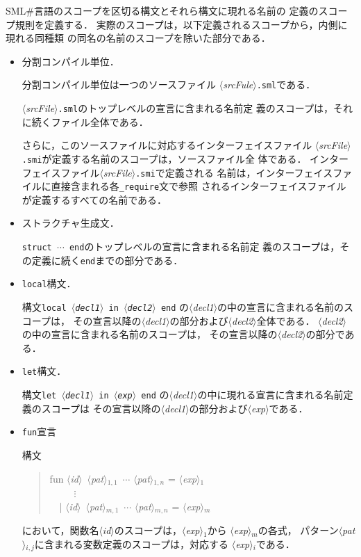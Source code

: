 \documentclass{jbook}
\newcommand{\smlsharp}{SML\#}
\newcommand{\code}[1]{\mbox{\large\tt #1}}
\newcommand{\nonterm}[1]{\mbox{$\langle$}{\it #1}\mbox{$\rangle$}}
\newenvironment{program}{\begin{quote}\begin{tt}}%
                        {\end{tt}\end{quote}}
\begin{document}
	\smlsharp{}言語のスコープを区切る構文とそれら構文に現れる名前の
定義のスコープ規則を定義する．
	実際のスコープは，以下定義されるスコープから，内側に現れる同種類
の同名の名前のスコープを除いた部分である．
\begin{itemize}
\item 分割コンパイル単位．

	分割コンパイル単位は一つのソースファイル
\nonterm{srcFule}{\tt .sml}である．

	\nonterm{srcFile}{\tt .sml}のトップレベルの宣言に含まれる名前定
義のスコープは，それに続くファイル全体である．

	さらに，このソースファイルに対応するインターフェイスファイル
\nonterm{srcFile}{\tt .smi}が定義する名前のスコープは，ソースファイル全
体である．
	インターフェイスファイル\nonterm{srcFile}{\tt .smi}で定義される
名前は，インターフェイスファイルに直接含まれる各\code{\_require}文で参照
されるインターフェイスファイルが定義するすべての名前である．

\item ストラクチャ生成文．

	\code{struct $\cdots$ end}のトップレベルの宣言に含まれる名前定
義のスコープは，その定義に続く\code{end}までの部分である．

\item \code{local}構文．

	構文\code{local \nonterm{decl1} in \nonterm{decl2} end}
の\nonterm{decl1}の中の宣言に含まれる名前のスコープは，
その宣言以降の\nonterm{decl1}の部分および\nonterm{decl2}全体である．
	\nonterm{decl2}の中の宣言に含まれる名前のスコープは，
その宣言以降の\nonterm{decl2}の部分である．

\item \code{let}構文．

	構文\code{let \nonterm{decl1} in \nonterm{exp} end}
の\nonterm{decl1}の中に現れる宣言に含まれる名前定義のスコープは
その宣言以降の\nonterm{decl1}の部分および\nonterm{exp}である．

\item \code{fun}宣言

構文
\begin{program}
fun \nonterm{id}\ \nonterm{pat}$_{1,1}$\ $\cdots$ \nonterm{pat}$_{1,n}$ = \nonterm{exp}$_1$\\
\ \ \ \ \ $\vdots$\\
\ \ | \nonterm{id}\ \nonterm{pat}$_{m,1}$\ $\cdots$ \nonterm{pat}$_{m,n}$ = \nonterm{exp}$_m$
\end{program}
において，関数名\nonterm{id}のスコープは，\nonterm{exp}$_1$から
\nonterm{exp}$_m$の各式，
パターン\nonterm{pat}$_{i,j}$に含まれる変数定義のスコープは，対応する
\nonterm{exp}$_i$である．


\end{itemize}
\end{document}
